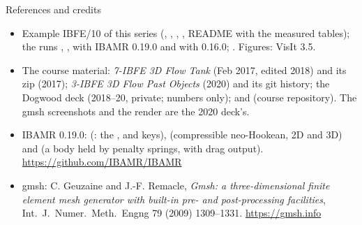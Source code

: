 \documentclass[aspectratio=169,11pt]{beamer}
\begin{document}
\begin{frame}{References and credits}
\label{fr:refs}
\scriptsize
\begin{itemize}
  \item Example IBFE/10 of this series (, , , , README with the measured tables); the runs , ,  with IBAMR 0.19.0 and  with 0.16.0; . Figures: VisIt 3.5.
  \item The course material: \emph{7-IBFE 3D Flow Tank} (Feb 2017, edited 2018) and its zip  (2017); \emph{3-IBFE 3D Flow Past Objects} (2020) and its git history; the Dogwood deck (2018--20, private; numbers only);  and  (course repository). The gmsh screenshots and the render are the 2020 deck's.
  \item IBAMR 0.19.0:  (: the ,  and  keys),  (compressible neo-Hookean, 2D and 3D) and  (a body held by penalty springs, with drag output). \url{https://github.com/IBAMR/IBAMR}
  \item gmsh: C. Geuzaine and J.-F. Remacle, \emph{Gmsh: a three-dimensional finite element mesh generator with built-in pre- and post-processing facilities}, Int.\ J.\ Numer.\ Meth.\ Engng 79 (2009) 1309--1331. \url{https://gmsh.info}
\end{itemize}
\end{frame}
\end{document}
